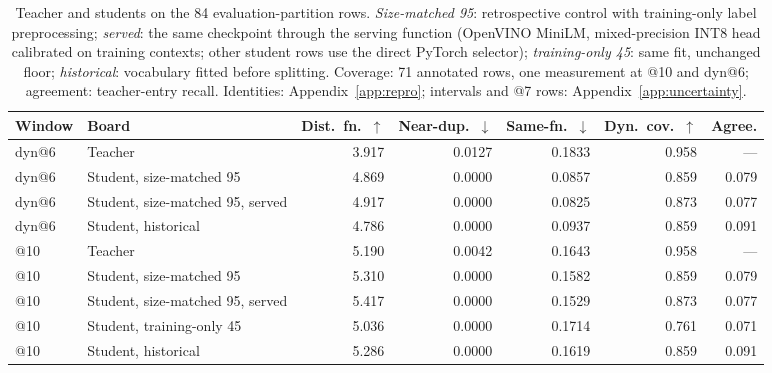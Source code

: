 \begin{table}[t]
\centering\footnotesize\renewcommand{\arraystretch}{0.9}
\setlength{\tabcolsep}{5pt}\setlength{\belowcaptionskip}{3pt}
\caption{Teacher and students on the 84 evaluation-partition rows. \emph{Size-matched 95}: retrospective control with training-only label preprocessing; \emph{served}: the same checkpoint through the serving function (OpenVINO MiniLM, mixed-precision INT8 head calibrated on training contexts; other student rows use the direct PyTorch selector); \emph{training-only 45}: same fit, unchanged floor; \emph{historical}: vocabulary fitted before splitting. Coverage: 71 annotated rows, one measurement at @10 and dyn@6; agreement: teacher-entry recall. Identities: Appendix~\ref{app:repro}; intervals and @7 rows: Appendix~\ref{app:uncertainty}.}
\label{tab:student}
\begin{tabular}{llrrrrr}
\toprule
Window & Board & Dist.\ fn.\ $\uparrow$ & Near-dup.\ $\downarrow$ & Same-fn.\ $\downarrow$ & Dyn.\ cov.\ $\uparrow$ & Agree.\\
\midrule
dyn@6 & Teacher & 3.917 & 0.0127 & 0.1833 & 0.958 & ---\\
dyn@6 & Student, size-matched 95 & 4.869 & 0.0000 & 0.0857 & 0.859 & 0.079\\
dyn@6 & Student, size-matched 95, served & 4.917 & 0.0000 & 0.0825 & 0.873 & 0.077\\ %
dyn@6 & Student, historical & 4.786 & 0.0000 & 0.0937 & 0.859 & 0.091\\
@10 & Teacher & 5.190 & 0.0042 & 0.1643 & 0.958 & ---\\
@10 & Student, size-matched 95 & 5.310 & 0.0000 & 0.1582 & 0.859 & 0.079\\
@10 & Student, size-matched 95, served & 5.417 & 0.0000 & 0.1529 & 0.873 & 0.077\\ %
@10 & Student, training-only 45 & 5.036 & 0.0000 & 0.1714 & 0.761 & 0.071\\
@10 & Student, historical & 5.286 & 0.0000 & 0.1619 & 0.859 & 0.091\\
\bottomrule
\end{tabular}
\end{table}

